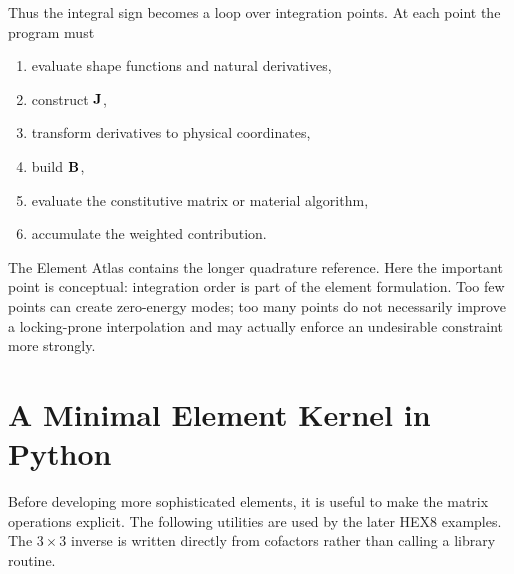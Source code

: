 Thus the integral sign becomes a loop over integration points. At each point the
program must

\begin{enumerate}
    \item evaluate shape functions and natural derivatives,
    \item construct $\mathbf{J}$,
    \item transform derivatives to physical coordinates,
    \item build $\mathbf{B}$,
    \item evaluate the constitutive matrix or material algorithm,
    \item accumulate the weighted contribution.
\end{enumerate}

The Element Atlas contains the longer quadrature reference. Here the important
point is conceptual: integration order is part of the element formulation. Too
few points can create zero-energy modes; too many points do not necessarily
improve a locking-prone interpolation and may actually enforce an undesirable
constraint more strongly.

\section{A Minimal Element Kernel in Python}

Before developing more sophisticated elements, it is useful to make the matrix
operations explicit. The following utilities are used by the later HEX8
examples. The $3\times3$ inverse is written directly from cofactors rather than
calling a library routine.

